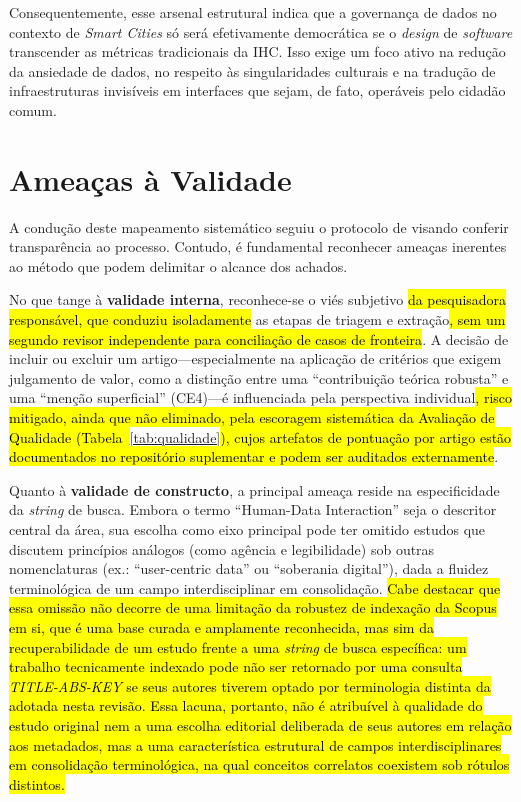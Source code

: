 \documentclass[12pt]{article}
\begin{document}
{{    Consequentemente, esse arsenal estrutural indica que a governança de dados no contexto de \textit{Smart Cities} só será efetivamente democrática se o \textit{design} de \textit{software} transcender as métricas tradicionais da IHC. Isso exige um foco ativo na redução da ansiedade de dados, no respeito às singularidades culturais e na tradução de infraestruturas invisíveis em interfaces que sejam, de fato, operáveis pelo cidadão comum.

    \section{Ameaças à Validade}
    \label{sec:ameacas}

    A condução deste mapeamento sistemático seguiu o protocolo de \cite{KITCHENHAM2013} visando conferir transparência ao processo. Contudo, é fundamental reconhecer ameaças inerentes ao método que podem delimitar o alcance dos achados.

    No que tange à \textbf{validade interna}, reconhece-se o viés subjetivo \hl{da pesquisadora responsável, que conduziu isoladamente} as etapas de triagem e extração\hl{, sem um segundo revisor independente para conciliação de casos de fronteira}. A decisão de incluir ou excluir um artigo---especialmente na aplicação de critérios que exigem julgamento de valor, como a distinção entre uma ``contribuição teórica robusta'' e uma ``menção superficial'' (CE4)---é influenciada pela perspectiva individual\hl{, risco mitigado, ainda que não eliminado, pela escoragem sistemática da Avaliação de Qualidade (Tabela~}\ref{tab:qualidade}\hl{), cujos artefatos de pontuação por artigo estão documentados no repositório suplementar e podem ser auditados externamente}.

    Quanto à \textbf{validade de constructo}, a principal ameaça reside na especificidade da \textit{string} de busca. Embora o termo ``Human-Data Interaction'' seja o descritor central da área, sua escolha como eixo principal pode ter omitido estudos que discutem princípios análogos (como agência e legibilidade) sob outras nomenclaturas (ex.: ``user-centric data'' ou ``soberania digital''), dada a fluidez terminológica de um campo interdisciplinar em consolidação. \hl{Cabe destacar que essa omissão não decorre de uma limitação da robustez de indexação da Scopus em si, que é uma base curada e amplamente reconhecida, mas sim da recuperabilidade de um estudo frente a uma \textit{string} de busca específica: um trabalho tecnicamente indexado pode não ser retornado por uma consulta \textit{TITLE-ABS-KEY} se seus autores tiverem optado por terminologia distinta da adotada nesta revisão. Essa lacuna, portanto, não é atribuível à qualidade do estudo original nem a uma escolha editorial deliberada de seus autores em relação aos metadados, mas a uma característica estrutural de campos interdisciplinares em consolidação terminológica, na qual conceitos correlatos coexistem sob rótulos distintos.}

}}
\end{document}
